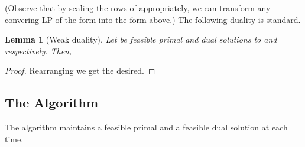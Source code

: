 \documentclass[letterpaper,11pt]{article}
\newtheorem{lemma}[thm]{Lemma}
\begin{document}
 (Observe that by
scaling the rows of  appropriately, we can transform any convering LP
of the form  into the form above.) The following duality is
standard.

\begin{lemma}[Weak duality]
Let  be feasible primal and dual solutions to  and  respectively. Then,

\end{lemma}
\begin{proof}

Rearranging we get the desired.
\end{proof}

\subsection{The Algorithm}
\label{sec:alg-description}

The algorithm maintains a feasible primal  and a feasible dual solution  at each time.
\end{document}
